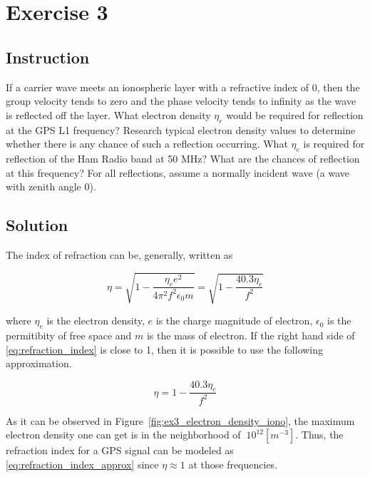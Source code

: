 \section{Exercise 3}

\subsection{Instruction}

If a carrier wave meets an ionospheric layer with a refractive index of 0, then
the group velocity tends to zero and the phase velocity tends to infinity as the
wave is reflected off the layer. What electron density $\eta_e$ would be required
for reflection at the GPS L1 frequency? Research typical electron density values
to determine whether there is any chance of such a reflection occurring. What
$\eta_e$ is required for reflection of the Ham Radio band at 50 MHz? What are the
chances of reflection at this frequency? For all reflections, assume a normally
incident wave (a wave with zenith angle 0).

\subsection{Solution}

The index of refraction can be, generally, written as

\begin{equation}
	\eta = \sqrt{1 - \frac{\eta_e e^2}{4 \pi^2 f^2 \epsilon_0 m}}
	= \sqrt{1 - \frac{40.3 \eta_e}{f^2}}
	\label{eq:refraction_index}
\end{equation}

where $\eta_e$ is the electron density, $e$ is the charge magnitude of electron,
$\epsilon_0$ is the permitibity of free space and $m$ is the mass of electron.
If the right hand side of \ref{eq:refraction_index} is close to 1, then it is
possible to use the following approximation.

\begin{equation}
	\eta = 1 - \frac{40.3 \eta_e}{f^2}
	\label{eq:refraction_index_approx}
\end{equation}

As it can be observed in Figure~\ref{fig:ex3_electron_density_iono}, the maximum
electron density one can get is in the neighborhood of $~10^{12} [m^{-3}]$. Thus,
the refraction index for a GPS signal can be modeled as \ref{eq:refraction_index_approx}
since $\eta \approx 1$ at those frequencies.

